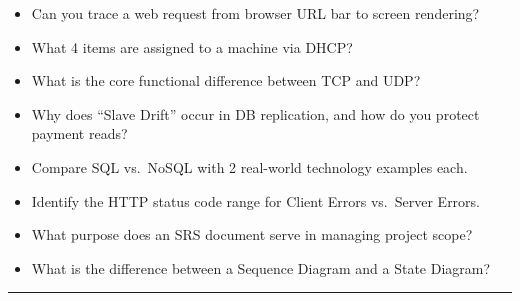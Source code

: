\documentclass[8pt, a4paper]{article}
\begin{document}
\begin{itemize}
  \item[$\square$] Can you trace a web request from browser URL bar to screen rendering?
  \item[$\square$] What 4 items are assigned to a machine via DHCP?
  \item[$\square$] What is the core functional difference between TCP and UDP?
  \item[$\square$] Why does ``Slave Drift'' occur in DB replication, and how do you protect payment reads?
  \item[$\square$] Compare SQL vs.\ NoSQL with 2 real-world technology examples each.
  \item[$\square$] Identify the HTTP status code range for Client Errors vs.\ Server Errors.
  \item[$\square$] What purpose does an SRS document serve in managing project scope?
  \item[$\square$] What is the difference between a Sequence Diagram and a State Diagram?
\end{itemize}

\vspace{14pt}
\textcolor{rulegray}{\rule{\linewidth}{1pt}}
\end{document}
